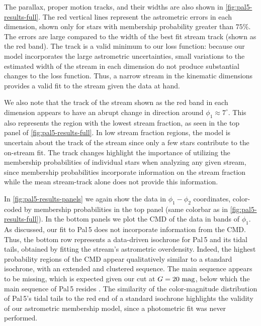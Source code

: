 \documentclass[twocolumn, linenumbers]{aastex631}
\newcommand{\stream}[1]{#1}
\begin{document}
        The parallax, proper motion tracks, and their widths are also shown in
        \autoref{fig:pal5-results-full}. The red vertical lines represent the
        astrometric errors in each dimension, shown only for stars with
        membership probability greater than $75\%$. The errors are large
        compared to the width of the best fit stream track (shown as the red
        band). The track is a valid minimum to our loss function: because our
        model incorporates the large astrometric uncertainties, small variations
        to the estimated width of the stream in each dimension do not produce
        substantial changes to the loss function. Thus, a narrow stream in the
        kinematic dimensions provides a valid fit to the stream given the data
        at hand. 
    
        We also note that the track of the stream shown as the red band in each
        dimension appears to have an abrupt change in direction around $\phi_1
        \approx 7^\circ$. This also represents the region with the lowest stream
        fraction, as seen in the top panel of \autoref{fig:pal5-results-full}.
        In low stream fraction regions, the model is uncertain about the track
        of the stream since only a few stars contribute to the on-stream fit.
        The track changes highlight the importance of utilizing the membership
        probabilities of individual stars when analyzing any given stream, since
        membership probabilities incorporate information on the stream fraction
        while the mean stream-track alone does not provide this information. 
    
        In \autoref{fig:pal5-results-panels} we again show the data in
        $\phi_1-\phi_2$ coordinates, color-coded by membership probabilities in
        the top panel (same colorbar as in \autoref{fig:pal5-results-full}). In
        the bottom panels we plot the CMD of the data in bands of $\phi_1$. As
        discussed, our fit to \stream{Pal\,5} does not incorporate information
        from the CMD.  Thus, the bottom row represents a data-driven isochrone
        for \stream{Pal\,5} and its tidal tails, obtained by fitting the
        stream's astrometric overdensity. Indeed, the highest probability
        regions of the CMD appear qualitatively similar to a standard isochrone,
        with an extended and clustered sequence. The main sequence appears to be
        missing, which is expected given our cut at $G = 20~\rm{mag}$, below
        which the main sequence of \stream{Pal\,5} resides \citep{Bonaca+2020}.
        The similarity of the color-magnitude distribution of \stream{Pal\,5}'s
        tidal tails to the red end of a standard isochrone highlights the
        validity of our astrometric membership model, since a photometric fit
        was never performed. 
\end{document}
